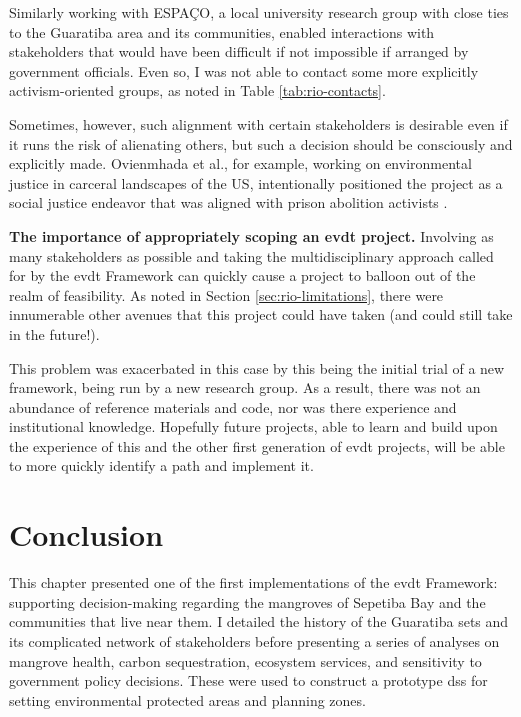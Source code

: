 Similarly working with ESPAÇO, a local university research group with close ties to the Guaratiba area and its communities, enabled interactions with stakeholders that would have been difficult if not impossible if arranged by government officials. Even so, I was not able to contact some more explicitly activism-oriented groups, as noted in Table \ref{tab:rio-contacts}.

Sometimes, however, such alignment with certain stakeholders is desirable even if it runs the risk of alienating others, but such a decision should be consciously and explicitly made. Ovienmhada et al., for example, working on environmental justice in carceral landscapes of the US, intentionally positioned the project as a social justice endeavor that was aligned with prison abolition activists \cite{ovienmhadaEnvironmentVulnerabilityDecisionTechnologyModelingFramework2021}. 

\textbf{The importance of appropriately scoping an \ac{evdt} project.} Involving as many stakeholders as possible and taking the multidisciplinary approach called for by the \ac{evdt} Framework can quickly cause a project to balloon out of the realm of feasibility. As noted in Section \ref{sec:rio-limitations}, there were innumerable other avenues that this project could have taken (and could still take in the future!). 

This problem was exacerbated in this case by this being the initial trial of a new framework, being run by a new research group. As a result, there was not an abundance of reference materials and code, nor was there experience and institutional knowledge. Hopefully future projects, able to learn and build upon the experience of this and the other first generation of \ac{evdt} projects, will be able to more quickly identify a path and implement it.


\section{Conclusion}

This chapter presented one of the first implementations of the \ac{evdt} Framework: supporting decision-making regarding the mangroves of Sepetiba Bay and the communities that live near them. I detailed the history of the Guaratiba \ac{sets} and its complicated network of stakeholders before presenting a series of analyses on mangrove health, carbon sequestration, ecosystem services, and sensitivity to government policy decisions. These were used to construct a prototype \ac{dss} for setting environmental protected areas and planning zones. 

